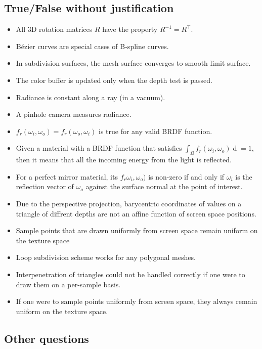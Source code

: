\documentclass[a4paper,10pt]{article}
\newcommand{\cmark}{\text{\ding{51}}}
\newcommand{\xmark}{\text{\ding{55}}}
\begin{document}
\subsection{True/False without justification}

\begin{itemize}
    \item[\cmark] All 3D rotation matrices \( R \) have the property \( R^{-1} = R^\top \).
    \item[\cmark] Bézier curves are special cases of B-spline curves.
    \item[\cmark] In subdivision surfaces, the mesh surface converges to smooth limit surface.
    \item[\cmark] The color buffer is updated only when the depth test is passed.
    \item[\cmark] Radiance is constant along a ray (in a vacuum).
    \item[\cmark] A pinhole camera measures radiance.
    \item[\cmark] \( f_r(\omega_i, \omega_o) = f_r(\omega_o, \omega_i) \) is true for any valid BRDF function.
    \item[\cmark] Given a material with a BRDF function that satisfies \( \int_\Omega f_r(\omega_i, \omega_o) \mathop{d\omega_i} = 1 \), then it means that all the incoming energy from the light is reflected.
    \item[\cmark] For a perfect mirror material, its \( f_r \omega _i, \omega _o) \) is non-zero if and only if \( \omega _i \) is the reflection vector of \( \omega _o \) against the surface normal at the point of interest.
    \item[\cmark] Due to the perspective projection, barycentric coordinates of values on a triangle of diffrent depths are not an affine function of screen space positions.
    \item[\xmark] Sample points that are drawn uniformly from screen space remain uniform on the texture space
    \item[\xmark] Loop subdivision scheme works for any polygonal meshes.
    \item[\xmark] Interpenetration of triangles could not be handled correctly if one were to draw them on a per-sample basis.
    \item[\xmark] If one were to sample points uniformly from screen space, they always remain uniform on the texture space.
\end{itemize}

\subsection{Other questions}
\end{document}
